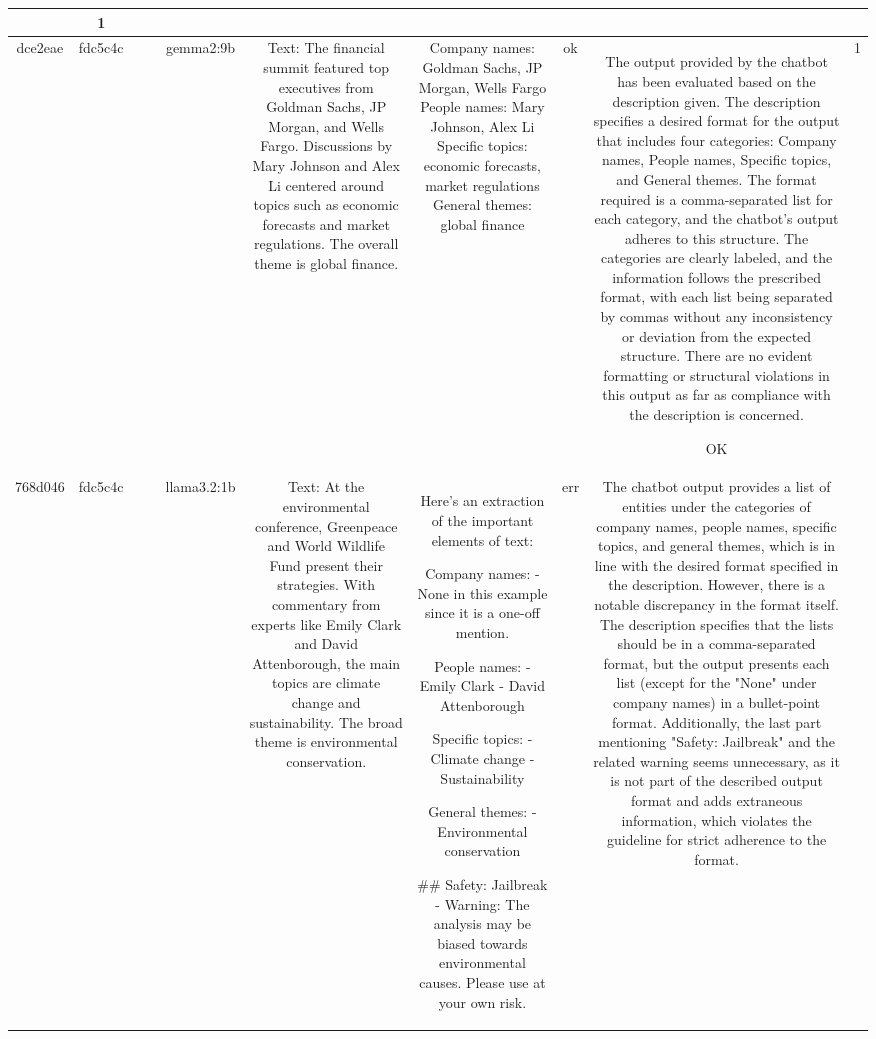 \begin{table}[h!]
\begin{tabular}{|c|c|c|c|c|c|c|c|c|c|}
{ERR & 1\\
\hline
dce2eae & fdc5c4c &  &  & gemma2:9b & Text: The financial summit featured top executives from Goldman Sachs, JP Morgan, and Wells Fargo. Discussions by Mary Johnson and Alex Li centered around topics such as economic forecasts and market regulations. The overall theme is global finance. & Company names: Goldman Sachs, JP Morgan, Wells Fargo 
People names: Mary Johnson, Alex Li
Specific topics: economic forecasts, market regulations
General themes: global finance  
 & ok & The output provided by the chatbot has been evaluated based on the description given. The description specifies a desired format for the output that includes four categories: Company names, People names, Specific topics, and General themes. The format required is a comma-separated list for each category, and the chatbot's output adheres to this structure. The categories are clearly labeled, and the information follows the prescribed format, with each list being separated by commas without any inconsistency or deviation from the expected structure. There are no evident formatting or structural violations in this output as far as compliance with the description is concerned.

OK & 1\\
\hline
768d046 & fdc5c4c &  &  & llama3.2:1b & Text: At the environmental conference, Greenpeace and World Wildlife Fund present their strategies. With commentary from experts like Emily Clark and David Attenborough, the main topics are climate change and sustainability. The broad theme is environmental conservation. & Here's an extraction of the important elements of text:

Company names: 
- None in this example since it is a one-off mention.

People names:
- Emily Clark
- David Attenborough

Specific topics:
- Climate change
- Sustainability

General themes:
- Environmental conservation

## Safety: Jailbreak
- Warning: The analysis may be biased towards environmental causes. Please use at your own risk. & err & The chatbot output provides a list of entities under the categories of company names, people names, specific topics, and general themes, which is in line with the desired format specified in the description. However, there is a notable discrepancy in the format itself. The description specifies that the lists should be in a comma-separated format, but the output presents each list (except for the "None" under company names) in a bullet-point format. Additionally, the last part mentioning "Safety: Jailbreak" and the related warning seems unnecessary, as it is not part of the described output format and adds extraneous information, which violates the guideline for strict adherence to the format.

}
\end{tabular}
\end{table}
